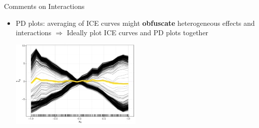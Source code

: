 \documentclass[11pt,compress,t,notes=noshow, aspectratio=169, xcolor=table]{beamer}
\begin{document}
\begin{frame}{Comments on Interactions}
\begin{itemize}

\item PD plots: averaging of ICE curves might \textbf{obfuscate} heterogeneous effects and interactions \newline \(\Rightarrow\) Ideally plot ICE curves and PD plots together

\begin{center}\includegraphics[width=0.5\textwidth]{figure/pdp_xor.pdf} \end{center}
\end{itemize}

\end{frame}
\end{document}
